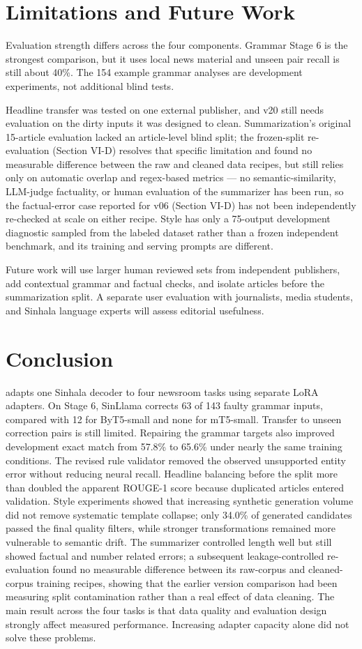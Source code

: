 \documentclass[a4paper,conference]{IEEEtran}
\begin{document}
\section{Limitations and Future Work}
Evaluation strength differs across the four components. Grammar Stage 6 is the
strongest comparison, but it uses local news material and unseen pair recall is
still about 40\%. The 154 example grammar analyses are development experiments,
not additional blind tests.

Headline transfer was tested on one external publisher, and v20 still needs
evaluation on the dirty inputs it was designed to clean. Summarization's
original 15-article evaluation lacked an article-level blind split; the
frozen-split re-evaluation (Section VI-D) resolves that specific limitation
and found no measurable difference between the raw and cleaned data recipes,
but still relies only on automatic overlap and regex-based metrics — no
semantic-similarity, LLM-judge factuality, or human evaluation of the
summarizer has been run, so the factual-error case reported for v06
(Section VI-D) has not been independently re-checked at scale on either
recipe. Style has only a 75-output
development diagnostic sampled from the labeled dataset rather than a frozen
independent benchmark, and its training and serving prompts are different.

Future work will use larger human reviewed sets from independent publishers,
add contextual grammar and factual checks, and isolate articles before the
summarization split. A separate user evaluation with journalists, media
students, and Sinhala language experts will assess editorial usefulness.

\balance
\section{Conclusion}
\systemname{} adapts one Sinhala decoder to four newsroom tasks using separate LoRA
adapters. On Stage 6, SinLlama corrects 63 of 143 faulty grammar inputs, compared
with 12 for ByT5-small and none for mT5-small. Transfer to unseen correction
pairs is still limited. Repairing the grammar targets also improved development
exact match from 57.8\% to 65.6\% under nearly the same training conditions.
The revised rule validator removed the observed unsupported entity error without
reducing neural recall. Headline balancing before the split more than doubled
the apparent ROUGE-1 score because duplicated articles entered validation. Style experiments showed that increasing synthetic generation volume did not
remove systematic template collapse; only 34.0\% of generated candidates
passed the final quality filters, while stronger transformations remained more
vulnerable to semantic drift. The summarizer controlled length well but still
showed factual and number related errors; a subsequent leakage-controlled
re-evaluation found no measurable difference between its raw-corpus and
cleaned-corpus training recipes, showing that the earlier version comparison
had been measuring split contamination rather than a real effect of data
cleaning. The
main result across the four tasks is that data quality and evaluation design
strongly affect measured performance. Increasing adapter capacity alone did
not solve these problems.
\end{document}
